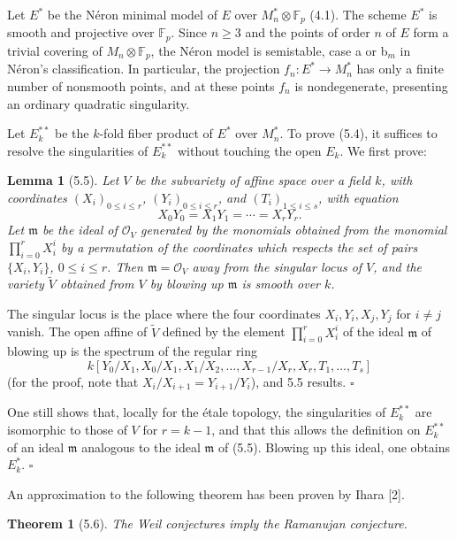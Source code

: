 \documentclass[10pt]{article}
\newcommand{\cO}{\mathcal O}
\newcommand{\QED}{\hfill$\square$}
\newcommand{\F}{\mathbb F}
\newtheorem*{theorem}{Theorem}
\newtheorem*{lemma}{Lemma}
\begin{document}
Let $E^*$ be the Néron minimal model of $E$ over $M_n^*\otimes\F_p$ (4.1). The scheme $E^*$ is smooth and projective over $\F_p$. Since $n\ge 3$ and the points of order $n$ of $E$ form a trivial covering of $M_n\otimes\F_p$, the Néron model is semistable, case a or b$_m$ in Néron's classification. In particular, the projection $f_n:E^*\to M_n^*$ has only a finite number of nonsmooth points, and at these points $f_n$ is nondegenerate, presenting an ordinary quadratic singularity.

Let $E_k^{**}$ be the $k$-fold fiber product of $E^*$ over $M_n^*$. To prove (5.4), it suffices to resolve the singularities of $E_k^{**}$ without touching the open $E_k$. We first prove:

\begin{lemma}[5.5]
Let $V$ be the subvariety of affine space over a field $k$, with coordinates $(X_i)_{0\le i\le r}$, $(Y_i)_{0\le i\le r}$, and $(T_i)_{1\le i\le s}$, with equation
\[
X_0Y_0=X_1Y_1=\cdots=X_rY_r.
\]
Let $\mathfrak m$ be the ideal of $\cO_V$ generated by the monomials obtained from the monomial $\prod_{i=0}^r X_i^i$ by a permutation of the coordinates which respects the set of pairs $\{X_i,Y_i\}$, $0\le i\le r$. Then $\mathfrak m=\cO_V$ away from the singular locus of $V$, and the variety $\widetilde V$ obtained from $V$ by blowing up $\mathfrak m$ is smooth over $k$.
\end{lemma}

The singular locus is the place where the four coordinates $X_i,Y_i,X_j,Y_j$ for $i\ne j$ vanish. The open affine of $\widetilde V$ defined by the element $\prod_{i=0}^r X_i^i$ of the ideal $\mathfrak m$ of blowing up is the spectrum of the regular ring
\[
k[Y_0/X_1, X_0/X_1, X_1/X_2,\ldots,X_{r-1}/X_r,X_r,T_1,\ldots,T_s]
\]
(for the proof, note that $X_i/X_{i+1}=Y_{i+1}/Y_i$), and 5.5 results. \QED

One still shows that, locally for the étale topology, the singularities of $E_k^{**}$ are isomorphic to those of $V$ for $r=k-1$, and that this allows the definition on $E_k^{**}$ of an ideal $\mathfrak m$ analogous to the ideal $\mathfrak m$ of (5.5). Blowing up this ideal, one obtains $E_k^*$. \QED

An approximation to the following theorem has been proven by Ihara [2].

\begin{theorem}[5.6]
The Weil conjectures imply the Ramanujan conjecture.
\end{theorem}
\end{document}
